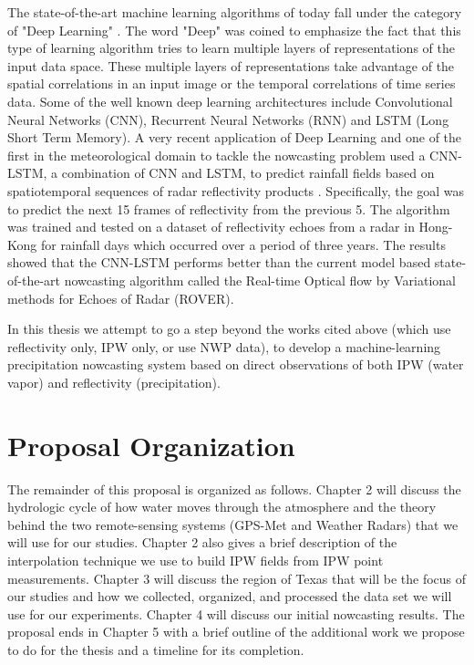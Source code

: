 \documentclass[proposal]{umassthesis}
\begin{document}
The state-of-the-art machine learning algorithms of today fall under the category of "Deep Learning" \cite{arel2010deep}. The word "Deep" was coined to emphasize the fact that this type of learning algorithm tries to learn multiple layers of representations of the input data space. These multiple layers of representations take advantage of the spatial correlations in an input image or the temporal correlations of time series data. Some of the well known deep learning architectures include Convolutional Neural Networks (CNN), Recurrent Neural Networks (RNN) and LSTM (Long Short Term Memory). A very recent application of Deep Learning and one of the first in the meteorological domain to tackle the nowcasting problem used a CNN-LSTM, a combination of CNN and LSTM, to predict rainfall fields based on spatiotemporal sequences of radar reflectivity products \cite{shi2015convolutional}. Specifically, the goal was to predict the next 15 frames of reflectivity from the previous 5. The algorithm was trained and tested on a dataset of reflectivity echoes from a radar in Hong-Kong for rainfall days which occurred over a period of three years. The results showed that the CNN-LSTM performs better than the current model based state-of-the-art nowcasting algorithm called the Real-time Optical flow by Variational methods for Echoes of Radar (ROVER). 

In this thesis we attempt to go a step beyond the works cited above (which use reflectivity only, IPW only, or use NWP data), to develop a machine-learning precipitation nowcasting system based on direct observations of both IPW (water vapor) and reflectivity (precipitation).

\section{Proposal Organization}

The remainder of this proposal is organized as follows. Chapter 2 will discuss the hydrologic cycle of how water moves through the atmosphere and the theory behind the two remote-sensing systems (GPS-Met and Weather Radars) that we will use for our studies. Chapter 2 also gives a brief description of the interpolation technique we use to build IPW fields from IPW point measurements. Chapter 3 will discuss the region of Texas that will be the focus of our studies and how we collected, organized, and processed the data set we will use for our experiments. Chapter 4 will discuss our initial nowcasting results. The proposal ends in Chapter 5 with a brief outline of the additional work we propose to do for the thesis and a timeline for its completion.
\end{document}
